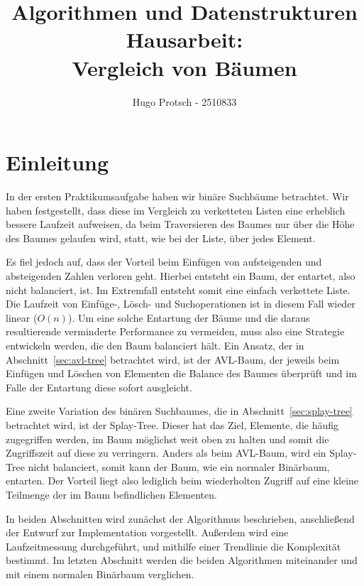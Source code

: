 \documentclass[a4paper]{article}
\title{Algorithmen und Datenstrukturen Hausarbeit:\\Vergleich von Bäumen}
\author{Hugo Protsch - 2510833}
\begin{document}
    \maketitle
    \tableofcontents
    \newpage
    \section*{Einleitung}\label{sec:Einleitung}

    In der ersten Praktikumsaufgabe haben wir binäre Suchbäume betrachtet.
    Wir haben festgestellt, dass diese im Vergleich zu verketteten Listen eine erheblich
    bessere Laufzeit aufweisen, da beim Traversieren des Baumes nur über die
    Höhe des Baumes gelaufen wird, statt, wie bei der Liste, über jedes Element.

    Es fiel jedoch auf, dass der Vorteil beim Einfügen von aufsteigenden und
    absteigenden Zahlen verloren geht.
    Hierbei entsteht ein Baum, der entartet, also nicht balanciert, ist.
    Im Extremfall entsteht somit eine einfach verkettete Liste.
    Die Laufzeit von Einfüge-, Lösch- und Suchoperationen
    ist in diesem Fall wieder linear (\(O(n)\)).
    Um eine solche Entartung der Bäume und die daraus resultierende verminderte Performance
    zu vermeiden, muss also eine Strategie entwickeln werden, die den Baum balanciert hält.
    Ein Ansatz, der in Abschnitt~\ref{sec:avl-tree} betrachtet wird, ist der AVL-Baum,
    der jeweils beim Einfügen und Löschen von Elementen die
    Balance des Baumes überprüft und im Falle der Entartung diese sofort ausgleicht.

    Eine zweite Variation des binären Suchbaumes, die in Abschnitt~\ref{sec:splay-tree}
    betrachtet wird, ist der Splay-Tree.
    Dieser hat das Ziel, Elemente, die häufig zugegriffen werden, im Baum möglichst weit oben zu
    halten und somit die Zugriffszeit auf diese zu verringern.
    Anders als beim AVL-Baum, wird ein Splay-Tree nicht balanciert, somit kann der Baum, wie ein
    normaler Binärbaum, entarten.
    Der Vorteil liegt also lediglich beim wiederholten Zugriff auf eine kleine Teilmenge der im
    Baum befindlichen Elementen.

    In beiden Abschnitten wird zunächst der Algorithmus beschrieben, anschließend der Entwurf zur
    Implementation vorgestellt.
    Außerdem wird eine Laufzeitmessung durchgeführt, und mithilfe einer Trendlinie die
    Komplexität bestimmt.
    Im letzten Abschnitt werden die beiden Algorithmen miteinander und mit einem normalen Binärbaum
    verglichen.
\end{document}
